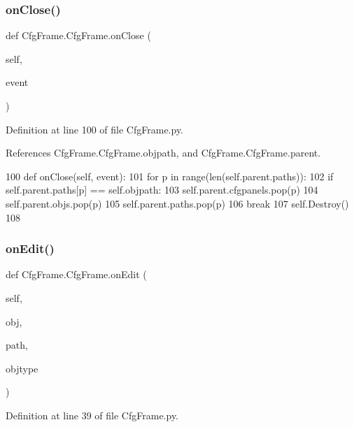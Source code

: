\subsubsection{\texorpdfstring{on\+Close()}{onClose()}}
{\footnotesize\ttfamily def Cfg\+Frame.\+Cfg\+Frame.\+on\+Close (\begin{DoxyParamCaption}\item[{}]{self,  }\item[{}]{event }\end{DoxyParamCaption})}



Definition at line 100 of file Cfg\+Frame.\+py.



References Cfg\+Frame.\+Cfg\+Frame.\+objpath, and Cfg\+Frame.\+Cfg\+Frame.\+parent.


\begin{DoxyCode}
100     \textcolor{keyword}{def }onClose(self, event):
101         \textcolor{keywordflow}{for} p \textcolor{keywordflow}{in} range(len(self.parent.paths)):
102             \textcolor{keywordflow}{if} self.parent.paths[p] == self.objpath:
103                 self.parent.cfgpanels.pop(p)
104                 self.parent.objs.pop(p)
105                 self.parent.paths.pop(p)
106                 \textcolor{keywordflow}{break}
107         self.Destroy()
108                 
\end{DoxyCode}
\mbox{\label{classCfgFrame_1_1CfgFrame_acf46c57cf539a9e2ed98333580508835}} 
\subsubsection{\texorpdfstring{on\+Edit()}{onEdit()}}
{\footnotesize\ttfamily def Cfg\+Frame.\+Cfg\+Frame.\+on\+Edit (\begin{DoxyParamCaption}\item[{}]{self,  }\item[{}]{obj,  }\item[{}]{path,  }\item[{}]{objtype }\end{DoxyParamCaption})}



Definition at line 39 of file Cfg\+Frame.\+py.


